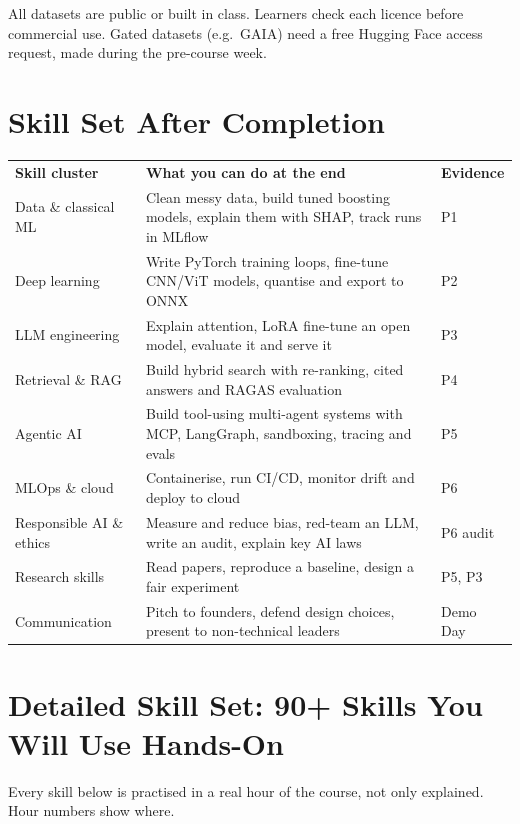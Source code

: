 \documentclass[11pt,a4paper]{article}
\begin{document}
\normalsize
\begin{goldnote}All datasets are public or built in class. Learners check each licence before commercial use. Gated datasets (e.g.\ GAIA) need a free Hugging Face access request, made during the pre-course week.\end{goldnote}

\section{Skill Set After Completion}
\small
{}
\begin{tabularx}{\linewidth}{@{}L{3.6cm} Y L{2.4cm}@{}}
\color{gold}\sffamily\bfseries Skill cluster & \color{gold}\sffamily\bfseries What you can do at the end & \color{gold}\sffamily\bfseries Evidence\\
Data \& classical ML & Clean messy data, build tuned boosting models, explain them with SHAP, track runs in MLflow & P1\\
Deep learning & Write PyTorch training loops, fine-tune CNN/ViT models, quantise and export to ONNX & P2\\
LLM engineering & Explain attention, LoRA fine-tune an open model, evaluate it and serve it & P3\\
Retrieval \& RAG & Build hybrid search with re-ranking, cited answers and RAGAS evaluation & P4\\
Agentic AI & Build tool-using multi-agent systems with MCP, LangGraph, sandboxing, tracing and evals & P5\\
MLOps \& cloud & Containerise, run CI/CD, monitor drift and deploy to cloud & P6\\
Responsible AI \& ethics & Measure and reduce bias, red-team an LLM, write an audit, explain key AI laws & P6 audit\\
Research skills & Read papers, reproduce a baseline, design a fair experiment & P5, P3\\
Communication & Pitch to founders, defend design choices, present to non-technical leaders & Demo Day\\
\end{tabularx}
\normalsize


\section{Detailed Skill Set: 90+ Skills You Will Use Hands-On}
Every skill below is practised in a real hour of the course, not only explained. Hour numbers show where.
\end{document}
